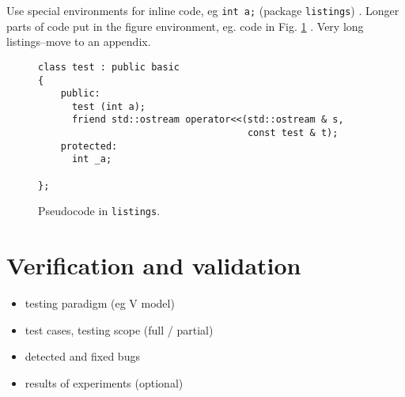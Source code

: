 \documentclass[a4paper,twoside,12pt]{book}
\begin{document}


Use special environments for inline code, eg  \lstinline|int a;| (package \texttt{listings})%
. Longer parts of code put in the figure environment, eg. code in Fig. \ref{fig:pseudocode:listings}%
. Very long listings–move to an appendix.


\clearpage
\begin{figure}
\centering
\begin{lstlisting}
class test : public basic
{
    public:
      test (int a);
      friend std::ostream operator<<(std::ostream & s,
                                     const test & t);
    protected:
      int _a;

};
\end{lstlisting}
\caption{Pseudocode in \texttt{listings}.}
\label{fig:pseudocode:listings}
\end{figure}

%




\chapter{Verification and validation}
\begin{itemize}
\item testing paradigm (eg V model)
\item test cases, testing scope (full / partial)
\item detected and fixed bugs
\item results of experiments (optional)
\end{itemize}
\end{document}
